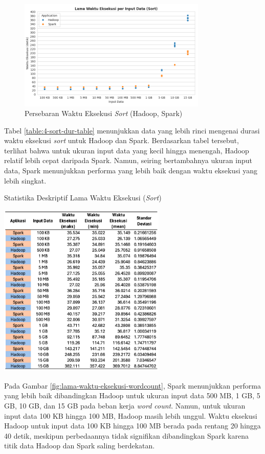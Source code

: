 \begin{figure}[h]
    \centering
    \includegraphics[width=0.8\textwidth]{figures/ch04/1-lama-waktu-eksekusi-sort.png}
    \caption{Persebaran Waktu Eksekusi \textit{Sort} (Hadoop, Spark)}
    \label{fig:lama-waktu-eksekusi-sort}
\end{figure}

Tabel \ref{table:4-sort-dur-table} menunjukkan data yang lebih rinci mengenai durasi waktu eksekusi \textit{sort} untuk Hadoop dan Spark. Berdasarkan tabel tersebut, terlihat bahwa untuk ukuran input data yang kecil hingga menengah, Hadoop relatif lebih cepat daripada Spark. Namun, seiring bertambahnya ukuran input data, Spark menunjukkan performa yang lebih baik dengan waktu eksekusi yang lebih singkat.

\begin{table}[h]
  \centering
  \caption{Statistika Deskriptif Lama Waktu Eksekusi (\textit{Sort})}
  \includegraphics[width=0.6\textwidth]{figures/ch04/4-sort-dur-table}
  \label{table:4-sort-dur-table}
\end{table}

\newpage
Pada Gambar \ref{fig:lama-waktu-eksekusi-wordcount}, Spark menunjukkan performa yang lebih baik dibandingkan Hadoop untuk ukuran input data 500 MB, 1 GB, 5 GB, 10 GB, dan 15 GB pada beban kerja \textit{word count}. Namun, untuk ukuran input data 100 KB hingga 100 MB, Hadoop masih lebih unggul. Waktu eksekusi Hadoop untuk input data 100 KB hingga 100 MB berada pada rentang 20 hingga 40 detik, meskipun perbedaannya tidak signifikan dibandingkan Spark karena titik data Hadoop dan Spark saling berdekatan.


